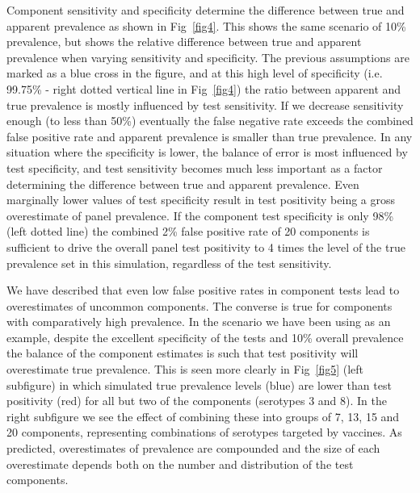 \documentclass[10pt,letterpaper]{article}
\begin{document}
Component sensitivity and specificity determine the difference between true and apparent prevalence as shown in Fig~\ref{fig4}.  This shows the same scenario of 10\% prevalence, but shows the relative difference between true and apparent prevalence when varying sensitivity and specificity. The previous assumptions are marked as a blue cross in the figure, and at this high level of specificity (i.e. 99.75\% - right dotted vertical line in Fig~\ref{fig4}) the ratio between apparent and true prevalence is mostly influenced by test sensitivity. If we decrease sensitivity enough (to less than 50\%) eventually the false negative rate exceeds the combined false positive rate and apparent prevalence is smaller than true prevalence. In any situation where the specificity is lower, the balance of error is most influenced by test specificity, and test sensitivity becomes much less important as a factor determining the difference between true and apparent prevalence. Even marginally lower values of test specificity result in test positivity being a gross overestimate of panel prevalence. If the component test specificity is only 98\% (left dotted line) the combined 2\% false positive rate of 20 components is sufficient to drive the overall panel test positivity to 4 times the level of the true prevalence set in this simulation, regardless of the test sensitivity.

We have described that even low false positive rates in component tests lead to overestimates of uncommon components. The converse is true for components with comparatively high prevalence. In the scenario we have been using as an example, despite the excellent specificity of the tests and 10\% overall prevalence the balance of the component estimates is such that test positivity will overestimate true prevalence. This is seen more clearly in Fig~\ref{fig5} (left subfigure) in which simulated true prevalence levels (blue) are lower than test positivity (red) for all but two of the components (serotypes 3 and 8). In the right subfigure we see the effect of combining these into groups of 7, 13, 15 and 20 components, representing combinations of serotypes targeted by vaccines. As predicted, overestimates of prevalence are compounded and the size of each overestimate depends both on the number and distribution of the test components.
\end{document}
